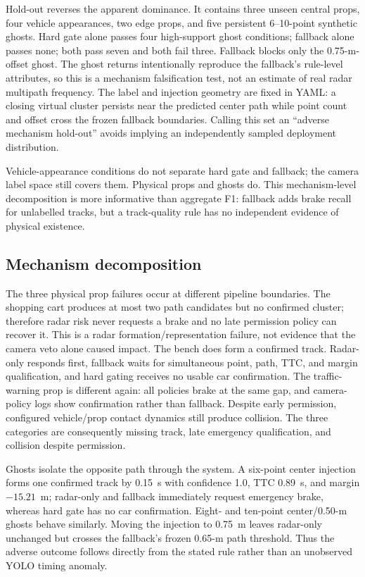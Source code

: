 \documentclass[conference]{IEEEtran}
\begin{document}
Hold-out reverses the apparent dominance. It contains three unseen central
props, four vehicle appearances, two edge props, and five persistent 6--10-point
synthetic ghosts. Hard gate alone passes four high-support ghost conditions;
fallback alone passes none; both pass seven and both fail three. Fallback blocks
only the 0.75-m-offset ghost. The ghost returns intentionally reproduce the
fallback's rule-level attributes, so this is a mechanism falsification test, not
an estimate of real radar multipath frequency. The label and injection geometry
are fixed in YAML: a closing virtual cluster persists near the predicted center
path while point count and offset cross the frozen fallback boundaries. Calling
this set an ``adverse mechanism hold-out'' avoids implying an independently
sampled deployment distribution.

Vehicle-appearance conditions do not separate hard gate and fallback; the
camera label space still covers them. Physical props and ghosts do. This
mechanism-level decomposition is more informative than aggregate F1: fallback
adds brake recall for unlabelled tracks, but a track-quality rule has no
independent evidence of physical existence.

\subsection{Mechanism decomposition}
The three physical prop failures occur at different pipeline boundaries. The
shopping cart produces at most two path candidates but no confirmed cluster;
therefore radar risk never requests a brake and no late permission policy can
recover it. This is a radar formation/representation failure, not evidence that
the camera veto alone caused impact. The bench does form a confirmed track.
Radar-only responds first, fallback waits for simultaneous point, path, TTC, and
margin qualification, and hard gating receives no usable car confirmation. The
traffic-warning prop is different again: all policies brake at the same gap,
and camera-policy logs show confirmation rather than fallback. Despite early
permission, configured vehicle/prop contact dynamics still produce collision.
The three categories are consequently missing track, late emergency
qualification, and collision despite permission.

Ghosts isolate the opposite path through the system. A six-point center
injection forms one confirmed track by 0.15~s with confidence 1.0,
TTC 0.89~s, and margin $-15.21$~m; radar-only and fallback immediately request
emergency brake, whereas hard gate has no car confirmation. Eight- and ten-point
center/0.50-m ghosts behave similarly. Moving the injection to 0.75~m leaves
radar-only unchanged but crosses the fallback's frozen 0.65-m path threshold.
Thus the adverse outcome follows directly from the stated rule rather than an
unobserved YOLO timing anomaly.
\end{document}

